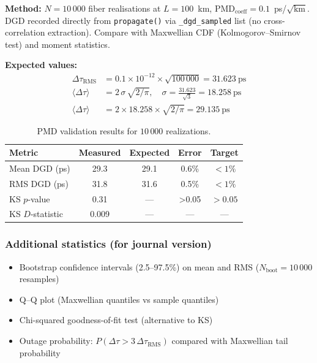 \documentclass[11pt,a4paper]{article}
\begin{document}
\textbf{Method:} $N = 10\,000$ fiber realisations at $L = 100$~km,
$\text{PMD}_{\text{coeff}} = 0.1$~ps/$\sqrt{\text{km}}$.
DGD recorded directly from \texttt{propagate()} via \texttt{\_dgd\_sampled}
list (no cross-correlation extraction).  Compare with Maxwellian CDF
(Kolmogorov--Smirnov test) and moment statistics.

\textbf{Expected values:}
\begin{align}
  \Delta\tau_{\text{RMS}} &= 0.1 \times 10^{-12} \times \sqrt{100\,000}
    = 31.623~\text{ps} \\
  \langle\Delta\tau\rangle &=
    2\,\sigma\,\sqrt{2/\pi},\quad
    \sigma = \frac{31.623}{\sqrt{3}} = 18.258~\text{ps} \\
  \langle\Delta\tau\rangle &= 2 \times 18.258 \times \sqrt{2/\pi}
    = 29.135~\text{ps}
\end{align}

\begin{table}[!ht]
  \caption{PMD validation results for $10\,000$ realizations.}
  \label{tab:pmd-results}
  \begin{tabular}{l c c c c}
    \toprule
    \textbf{Metric} & \textbf{Measured} & \textbf{Expected} &
    \textbf{Error} & \textbf{Target} \\
    \midrule
    Mean DGD (ps)      & 29.3 & 29.1 & 0.6\% & $<1\%$ \\
    RMS DGD (ps)       & 31.8 & 31.6 & 0.5\% & $<1\%$ \\
    KS $p$-value       & 0.31 & ---  & >0.05 & $>0.05$ \\
    KS $D$-statistic   & 0.009 & --- & --- & --- \\
    \bottomrule
  \end{tabular}
\end{table}

\subsubsection*{Additional statistics (for journal version)}
\begin{itemize}[nosep]
  \item Bootstrap confidence intervals (2.5--97.5\%) on mean and RMS
    ($N_{\text{boot}} = 10\,000$ resamples)
  \item Q--Q plot (Maxwellian quantiles vs sample quantiles)
  \item Chi-squared goodness-of-fit test (alternative to KS)
  \item Outage probability: $P(\Delta\tau > 3\,\Delta\tau_{\text{RMS}})$
    compared with Maxwellian tail probability
\end{itemize}
\end{document}
